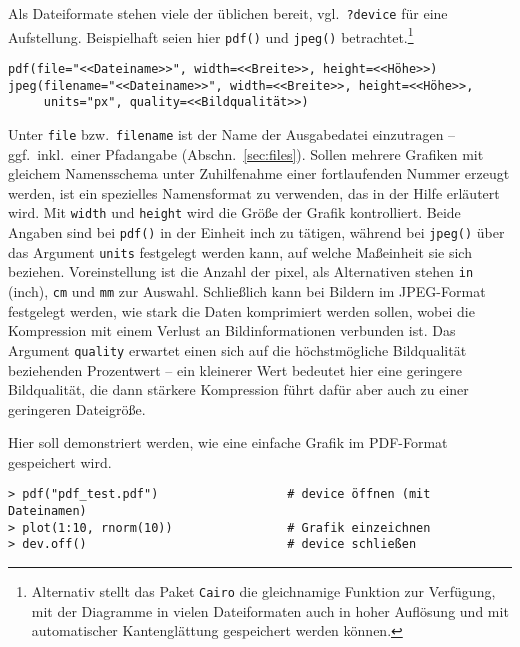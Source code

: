 Als Dateiformate stehen viele der üblichen bereit, vgl.\ \lstinline!?device! für eine Aufstellung. Beispielhaft seien hier \lstinline!pdf()! und \lstinline!jpeg()!  betrachtet.\footnote{Alternativ stellt das Paket \lstinline!Cairo! \cite{Urbanek2014} die gleichnamige Funktion zur Verfügung, mit der Diagramme in vielen Dateiformaten auch in hoher Auflösung und mit automatischer Kantenglättung gespeichert werden können.}
\begin{lstlisting}
pdf(file="<<Dateiname>>", width=<<Breite>>, height=<<Höhe>>)
jpeg(filename="<<Dateiname>>", width=<<Breite>>, height=<<Höhe>>,
     units="px", quality=<<Bildqualität>>)
\end{lstlisting}

Unter \lstinline!file! bzw.\ \lstinline!filename! ist der Name der Ausgabedatei einzutragen -- ggf.\ inkl.\ einer Pfadangabe (Abschn.\ \ref{sec:files}). Sollen mehrere Grafiken mit gleichem Namensschema unter Zuhilfenahme einer fortlaufenden Nummer erzeugt werden, ist ein spezielles Namensformat zu verwenden, das in der Hilfe erläutert wird. Mit \lstinline!width! und \lstinline!height! wird die Größe der Grafik kontrolliert. Beide Angaben sind bei \lstinline!pdf()! in der Einheit inch zu tätigen, während bei \lstinline!jpeg()! über das Argument \lstinline!units! festgelegt werden kann, auf welche Maßeinheit sie sich beziehen. Voreinstellung ist die Anzahl der pixel, als Alternativen stehen \lstinline!in! (inch), \lstinline!cm! und \lstinline!mm! zur Auswahl. Schließlich kann bei Bildern im JPEG-Format festgelegt werden, wie stark die Daten komprimiert werden sollen, wobei die Kompression mit einem Verlust an Bildinformationen verbunden ist. Das Argument \lstinline!quality! erwartet einen sich auf die höchstmögliche Bildqualität beziehenden Prozentwert -- ein kleinerer Wert bedeutet hier eine geringere Bildqualität, die dann stärkere Kompression führt dafür aber auch zu einer geringeren Dateigröße.

Hier soll demonstriert werden, wie eine einfache Grafik im PDF-Format gespeichert wird.
\begin{lstlisting}
> pdf("pdf_test.pdf")                  # device öffnen (mit Dateinamen)
> plot(1:10, rnorm(10))                # Grafik einzeichnen
> dev.off()                            # device schließen
\end{lstlisting}

